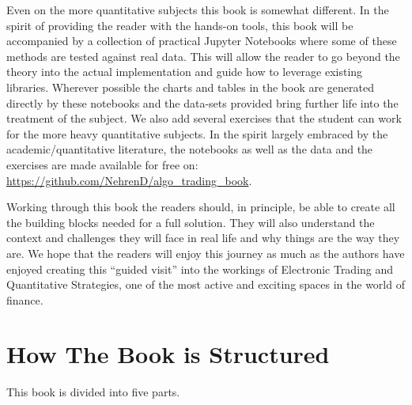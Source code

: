 Even on the more quantitative subjects this book is somewhat different. In the spirit of providing the reader with the hands-on tools, this book will be accompanied by a collection of practical Jupyter Notebooks where some of these methods are tested against real data. This will allow the reader to go beyond the theory into the actual implementation and guide how to leverage existing libraries. Wherever possible the charts and tables in the book are generated directly by these notebooks and the data-sets provided bring further life into the treatment of the subject. We also add several exercises that the student can work for the more heavy quantitative subjects. In the spirit largely embraced by the academic/quantitative literature, the notebooks as well as the data and the exercises are made  available for free on: \url{https://github.com/NehrenD/algo_trading_book}.


Working through this book the readers should, in principle, be able to create all the building blocks needed for a full solution. They will also understand the context and challenges they will face in real life and why things are the way they are. We hope that the readers will enjoy this journey as much as the authors have enjoyed creating this ``guided visit'' into the workings of Electronic Trading and Quantitative Strategies, one of the most active and exciting spaces in the world of finance.



\section{How The Book is Structured}

This book is divided into five parts. 

